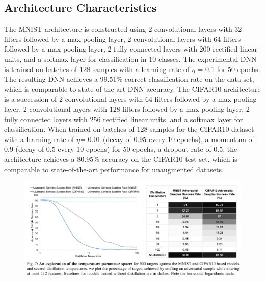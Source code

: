 \documentclass[12pt]{article}
\begin{document}
\subsection*{Architecture Characteristics\cite{paper}}
The MNIST architecture is constructed using 2 convolutional
layers with 32 filters followed by a max pooling layer,
2 convolutional layers with 64 filters followed by a max
pooling layer, 2 fully connected layers with 200 rectified linear
units, and a softmax layer for classification in 10 classes. The
experimental DNN is trained on batches of 128 samples with
a learning rate of $\eta $ = 0.1 for 50 epochs. The resulting DNN
achieves a 99.51\% correct classification rate on the data set,
which is comparable to state-of-the-art DNN accuracy.
The CIFAR10 architecture is a succession of 2 convolutional
layers with 64 filters followed by a max pooling layer, 2 convolutional
layers with 128 filters followed by a max pooling
layer, 2 fully connected layers with 256 rectified linear units,
and a softmax layer for classification. When trained on batches
of 128 samples for the CIFAR10 dataset with a learning rate
of $\eta $= 0.01 (decay of 0.95 every 10 epochs), a momentum of
0.9 (decay of 0.5 every 10 epochs) for 50 epochs, a dropout
rate of 0.5, the architecture achieves a 80.95\% accuracy on
the CIFAR10 test set, which is comparable to state-of-the-art
performance for unaugmented datasets.
\begin{figure}[H]
\begin{center}
\includegraphics[scale=.15]{performance}
\end{center}
\end{figure}  
\end{document}
